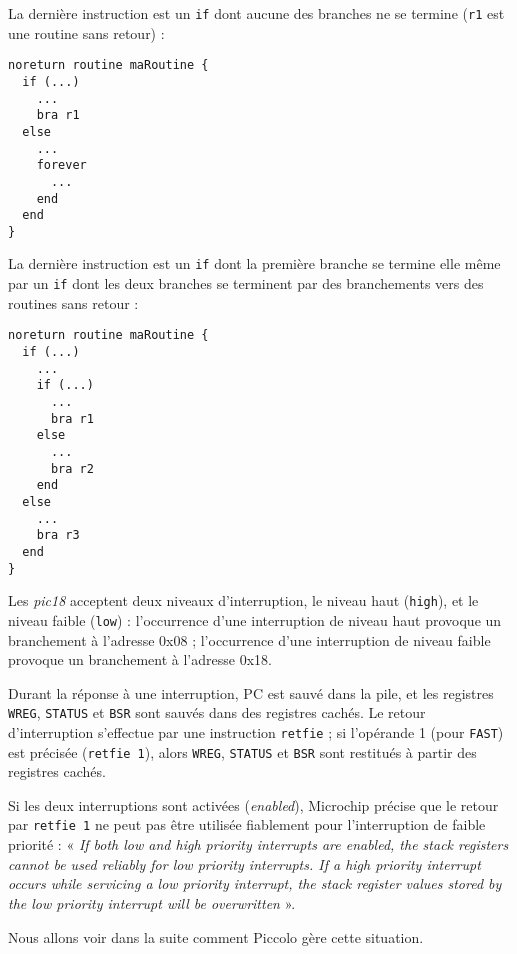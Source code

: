 La dernière instruction est un \texttt{if} dont aucune des branches ne se termine (\texttt{r1} est une routine sans retour) :
\begin{lstlisting}[language=piccolo]
noreturn routine maRoutine {
  if (...)
    ...
    bra r1
  else
    ...
    forever
      ...
    end
  end
}

\end{lstlisting}


La dernière instruction est un \texttt{if} dont la première branche se termine elle même par un \texttt{if} dont les deux branches se terminent par des branchements vers des routines sans retour :
\begin{lstlisting}[language=piccolo]
noreturn routine maRoutine {
  if (...)
    ...
    if (...)
      ...
      bra r1
    else
      ...
      bra r2
    end
  else
    ...
    bra r3
  end
}
\end{lstlisting}









Les \emph{pic18} acceptent deux niveaux d’interruption, le niveau haut (\texttt{high}), et le niveau faible (\texttt{low}) :
l’occurrence d’une interruption de niveau haut provoque un branchement à l’adresse 0x08 ;
l’occurrence d’une interruption de niveau faible provoque un branchement à l’adresse 0x18.

Durant la réponse à une interruption, PC est sauvé dans la pile, et les registres \texttt{WREG}, \texttt{STATUS} et \texttt{BSR} sont sauvés dans des registres cachés. Le retour d’interruption s’effectue par une instruction \texttt{retfie} ; si l’opérande 1 (pour \texttt{FAST}) est précisée (\texttt{retfie 1}), alors \texttt{WREG}, \texttt{STATUS} et \texttt{BSR} sont restitués à partir des registres cachés.

Si les deux interruptions sont activées (\emph{enabled}), Microchip précise que le retour par \texttt{retfie 1} ne peut pas être utilisée fiablement pour l’interruption de faible priorité : « \emph{If both low and high priority interrupts are enabled, the stack registers cannot be used reliably for low priority interrupts. If a high priority interrupt occurs while servicing a low priority interrupt, the stack register values stored by the low priority interrupt will be overwritten} ».

Nous allons voir dans la suite comment Piccolo gère cette situation.

